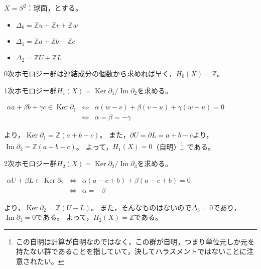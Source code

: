 \documentclass[uplatex]{jsarticle}
\DeclareMathOperator{\Image}{Im}
\DeclareMathOperator{\Kernel}{Ker}
\begin{document}
\begin{rei}[球面のホモロジー群]
	$X = S^{2}$：球面，とする。
	\begin{center}
	\end{center}
	\begin{itemize}
		\vspace{-0.5\baselineskip}
		\item $\Delta_{0} = \mathbb{Z} u + \mathbb{Z} v + \mathbb{Z} w$
		\item $\Delta_{1} = \mathbb{Z} a + \mathbb{Z} b + \mathbb{Z} c$
		\item $\Delta_{2} = \mathbb{Z} U + \mathbb{Z} L$
	\end{itemize}

	0次ホモロジー群は連結成分の個数から求めれば早く，$H_{0}(X) = \mathbb{Z}$。

	1次ホモロジー群$H_{1}(X) = \Kernel \partial_{1} / \Image \partial_{2}$を求める。
	\renewcommand{\arraystretch}{1}
	\begin{center}
		$\begin{array}{lcl}
			\alpha a + \beta b + \gamma c \in \Kernel \partial_{1} & \Longleftrightarrow & \alpha (w-v) + \beta (v-u) + \gamma (w-u) = 0 \\
			& \Longleftrightarrow & \alpha = \beta = - \gamma 
		\end{array}$
	\end{center}
	\renewcommand{\arraystretch}{1.3}
	より，$\Kernel \partial_{1} = \mathbb{Z} (a+b-c)$。
	また，$\partial U = \partial L = a+b-c$より，$\Image \partial_{2} = \mathbb{Z} (a+b-c)$。
	よって，$H_{1}(X) = 0$（自明）\footnote{この自明は計算が自明なのではなく，この群が自明，つまり単位元しか元を持たない群であることを指していて，決してハラスメントではないことに注意されたい。}\ である。

	2次ホモロジー群$H_{2}(X) = \Kernel \partial_{2} / \Image \partial_{3}$を求める。
	\renewcommand{\arraystretch}{1}
	\begin{center}
		$\begin{array}{lcl}
			\alpha U + \beta L \in \Kernel \partial_{2} & \Longleftrightarrow & \alpha (a-c+b) + \beta (a-c+b) = 0 \\
			& \Longleftrightarrow & \alpha = - \beta
		\end{array}$
	\end{center}
	\renewcommand{\arraystretch}{1.3}
	より，$\Kernel \partial_{2} = \mathbb{Z} (U-L)$。
	また，そんなものはないので$\Delta_{3} = 0$であり，$\Image \partial_{3} = 0$である。
	よって，$H_{2}(X) = \mathbb{Z}$である。


\end{rei}
\end{document}
